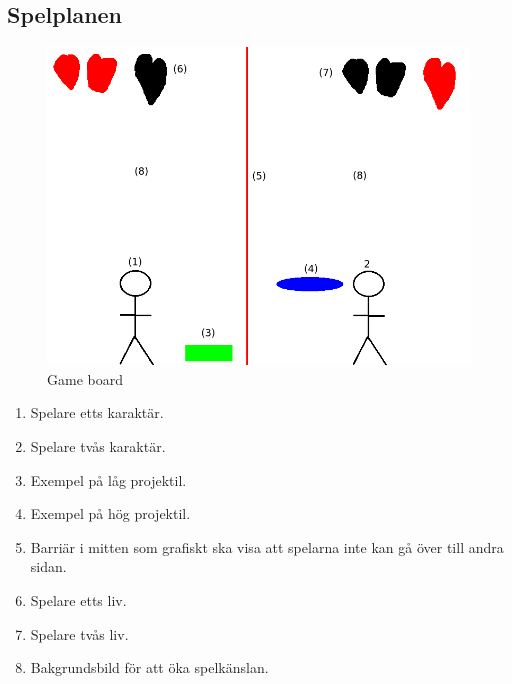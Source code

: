 \documentclass{TDP003mall}
\begin{document}
\subsection{Spelplanen}
\begin{figure}[H]
    \centering
    \includegraphics[width = \linewidth]{gameboard.png}
    \caption{Game board}
    \label{fig:Game board}
\end{figure}
\begin{enumerate}
\item Spelare etts karaktär.
\item Spelare tvås karaktär.
\item Exempel på låg projektil.
\item Exempel på hög projektil.
\item Barriär i mitten som grafiskt ska visa att spelarna inte kan gå över till andra sidan.
\item Spelare etts liv.
\item Spelare tvås liv.
\item Bakgrundsbild för att öka spelkänslan.
\end{enumerate}
\end{document}

